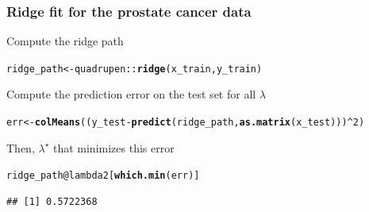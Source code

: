 \documentclass{beamer}\usepackage[]{graphicx}\usepackage[]{color}
\makeatletter
\newcommand{\hlnum}[1]{\textcolor[rgb]{0.686,0.059,0.569}{#1}}%
\newcommand{\hlopt}[1]{\textcolor[rgb]{0,0,0}{#1}}%
\newcommand{\hlstd}[1]{\textcolor[rgb]{0.345,0.345,0.345}{#1}}%
\newcommand{\hlkwb}[1]{\textcolor[rgb]{0.69,0.353,0.396}{#1}}%
\newcommand{\hlkwc}[1]{\textcolor[rgb]{0.333,0.667,0.333}{#1}}%
\newcommand{\hlkwd}[1]{\textcolor[rgb]{0.737,0.353,0.396}{\textbf{#1}}}%
\newenvironment{kframe}{%
 \def\at@end@of@kframe{}%
 \ifinner\ifhmode%
  \def\at@end@of@kframe{\end{minipage}}%
  \begin{minipage}{\columnwidth}%
 \fi\fi%
 \def\FrameCommand##1{\hskip\@totalleftmargin \hskip-\fboxsep
 \colorbox{shadecolor}{##1}\hskip-\fboxsep
     \hskip-\linewidth \hskip-\@totalleftmargin \hskip\columnwidth}%
 \MakeFramed {\advance\hsize-\width
   \@totalleftmargin\z@ \linewidth\hsize
   \@setminipage}}%
 {\par\unskip\endMakeFramed%
 \at@end@of@kframe}
\newenvironment{knitrout}{}{} %
\makeatother
\begin{document}







\begin{frame}[containsverbatim]
  \frametitle{Ridge fit for the prostate cancer data}

  \vfill

Compute the ridge path
\begin{knitrout}\scriptsize
{}\color{fgcolor}\begin{kframe}
\begin{alltt}
\hlstd{ridge_path} \hlkwb{<-} \hlstd{quadrupen}\hlopt{::}\hlkwd{ridge}\hlstd{(x_train, y_train)}
\end{alltt}
\end{kframe}
\end{knitrout}

\vfill

Compute the prediction error on the test set for all $\lambda$
\begin{knitrout}\scriptsize
{}\color{fgcolor}\begin{kframe}
\begin{alltt}
\hlstd{err} \hlkwb{<-} \hlkwd{colMeans}\hlstd{((y_test} \hlopt{-} \hlkwd{predict}\hlstd{(ridge_path,} \hlkwd{as.matrix}\hlstd{(x_test)))}\hlopt{^}\hlnum{2}\hlstd{)}
\end{alltt}
\end{kframe}
\end{knitrout}

\vfill

Then, $\lambda^\star$ that minimizes this error
\begin{knitrout}\scriptsize
{}\color{fgcolor}\begin{kframe}
\begin{alltt}
\hlstd{ridge_path}\hlopt{@}\hlkwc{lambda2}\hlstd{[}\hlkwd{which.min}\hlstd{(err)]}
\end{alltt}
\begin{verbatim}
## [1] 0.5722368
\end{verbatim}
\end{kframe}
\end{knitrout}


\end{frame}
\end{document}
